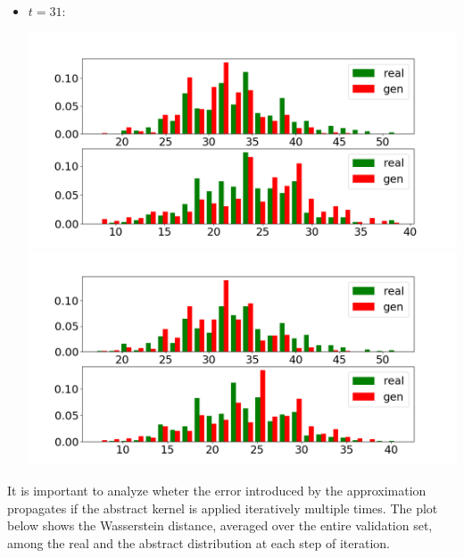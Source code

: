 \documentclass{article}
\begin{document}
\begin{itemize}
\begin{center}
    \end{center}
    \item $t = 31$:
        \begin{center}
        \includegraphics[scale = 0.18]{new_img/eSIR_orig_dataset_hist_comparison_[ 0.04 -0.08]_t_31.png}
        \includegraphics[scale=0.18]{new_img/eSIR_orig_dataset_hist_comparison_[ 0.12 -0.64]_t_31.png}
    \end{center}
\end{itemize}

It is important to analyze wheter the error introduced by the approximation propagates if the abstract kernel is applied iteratively multiple times. The plot below shows the Wasserstein distance, averaged over the entire validation set, among the real and the abstract distribution at each step of iteration.
\end{document}
